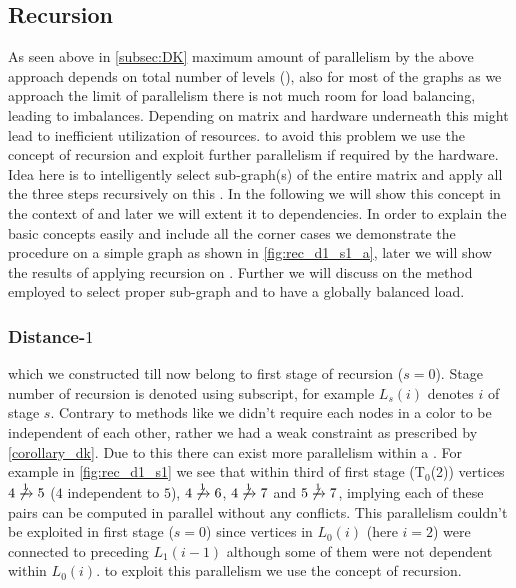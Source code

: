 	\subsection{Recursion}\label{subsec:REC}
	As seen above in \cref{subsec:DK} maximum amount of parallelism by the above approach depends on total number of levels (\totalLvl), also for most of the graphs as we approach the limit of parallelism there is not much room for load balancing, leading to imbalances. Depending on matrix and hardware underneath this might lead to inefficient utilization of resources. \Inorder to avoid this problem we use the concept of recursion and exploit further parallelism if required by the hardware. Idea here is to intelligently select sub-graph(s) of the entire matrix and apply all the three steps recursively on this \subgraph. In the following we will show this concept in the context of \DONE and  later we will extent it to \DK dependencies. In order to explain the basic concepts easily and include all the corner cases we demonstrate the procedure on a simple graph as shown in \cref{fig:rec_d1_s1_a}, later we will show the results of applying recursion on \stex. Further we will discuss on the method employed to select proper sub-graph and to have a globally balanced load.
	
	\subsubsection{Distance-$1$}
	\LevelGroups which we constructed till now belong to first stage of recursion ($s=0$). Stage number of recursion is denoted using subscript, \ie for example $L_s(i)$ denotes \level $i$ of stage $s$. Contrary to methods like \MCfull we didn't require each nodes in a color to be \DONE independent of each other, rather we had a weak constraint as prescribed by \cref{corollary_dk}. Due to this there can exist more parallelism within a \levelGroup. For example in \cref{fig:rec_d1_s1} we see that within third \levelGroup of first stage (T$_0$(2)) vertices $4 \not\xrightarrow{1} 5$ ($4$  \DONE independent to $5$), $4 \not\xrightarrow{1} 6$, $4 \not\xrightarrow{1} 7$ and $5 \not\xrightarrow{1} 7$, implying each of these pairs can be computed in parallel without any \DONE conflicts. This parallelism couldn't be exploited in first stage ($s=0$)  since vertices in $L_0(i)$ (here $i=2$) were connected to preceding \level $L_1(i-1)$ although some of them were not \DONE dependent within $L_0(i)$. \Inorder to exploit this parallelism we use the concept of recursion.
	
